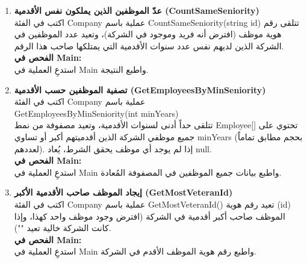 \documentclass[14pt]{extarticle}
\begin{document}
\begin{enumerate}[label=\textbf{تمرين \arabic*:}, wide=0pt, itemsep=2.2em]

    \item \textbf{عدّ الموظفين الذين يملكون نفس الأقدمية (\textenglish{CountSameSeniority})} \\
    اكتب في الفئة \textenglish{Company} عملية باسم \textenglish{CountSameSeniority(string id)} تتلقى رقم هوية موظف (افترض أنه فريد وموجود في الشركة)، وتعيد عدد الموظفين في الشركة الذين لديهم نفس عدد سنوات الأقدمية التي يمتلكها صاحب هذا الرقم. \\
    \textbf{الفحص في \textenglish{Main}:} \\
    استدعِ العملية في \textenglish{Main} واطبع النتيجة.
    \filbreak

    \item \textbf{تصفية الموظفين حسب الأقدمية (\textenglish{GetEmployeesByMinSeniority})} \\
    اكتب في الفئة \textenglish{Company} عملية باسم \\
    \textenglish{GetEmployeesByMinSeniority(int minYears)} \\
    تتلقى حداً أدنى لسنوات الأقدمية، وتعيد مصفوفة من نمط \textenglish{Employee[]} تحتوي على جميع موظفي الشركة الذين أقدميتهم أكبر أو تساوي \textenglish{minYears} (بحجم مطابق تماماً لعددهم). إذا لم يوجد أي موظف يحقق الشرط، يُعاد \textenglish{null}. \\
    \textbf{الفحص في \textenglish{Main}:} \\
    استدعِ العملية في \textenglish{Main} واطبع بيانات جميع الموظفين في المصفوفة المُعادة.
    \filbreak

    \item \textbf{إيجاد الموظف صاحب الأقدمية الأكبر (\textenglish{GetMostVeteranId})} \\
    اكتب في الفئة \textenglish{Company} عملية باسم \textenglish{GetMostVeteranId()} تعيد رقم هوية (\textenglish{id}) الموظف صاحب أكبر أقدمية في الشركة (افترض وجود موظف واحد كهذا، وإذا كانت الشركة خالية تعيد \textenglish{""}). \\
    \textbf{الفحص في \textenglish{Main}:} \\
    استدعِ العملية في \textenglish{Main} واطبع رقم هوية الموظف الأقدم في الشركة.
    \filbreak


\end{enumerate}
\end{document}
